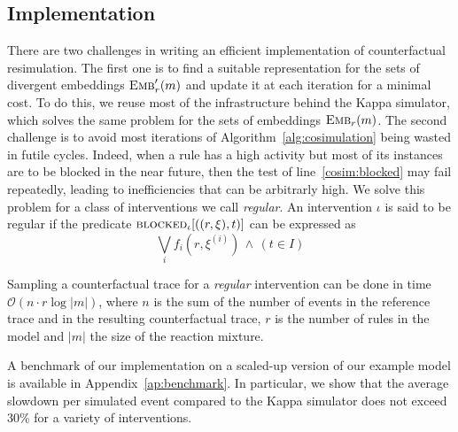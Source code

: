 
\subsection{Implementation}\label{subsec:implementation}

There are two challenges in writing an efficient implementation of
counterfactual resimulation. The first one is to find a suitable
representation for the sets of divergent embeddings ${\textsc{Emb}}'_{r}(m)$ and
update it at each iteration for a minimal cost. To do this, we reuse
most of the infrastructure behind the Kappa simulator, which solves
the same problem for the sets of embeddings ${\textsc{Emb}}_{r}(m)$. The second
challenge is to avoid most iterations of
Algorithm~\ref{alg:cosimulation} being wasted in {futile
  cycles}. Indeed, when a rule has a high activity but most of its
instances are to be blocked in the near future, then the test of
line~\ref{cosim:blocked} may fail repeatedly, leading to inefficiencies
that can be arbitrarly high. We solve this problem for a class of
interventions we call \emph{regular}. An intervention $\iota$ is said
to be regular if the predicate ${\textsc{blocked}}_{\iota}[((r, \xi), t)]$ can be
expressed as
\[ \bigvee_i f_i(r, \xi^{(i)}) \,\wedge\, (t \in I)  \]

\begin{proposition}
  Sampling a counterfactual trace for a \emph{regular} intervention
  can be done in time $\mathcal{O}(n \cdot r \log|m|)$, where $n$ is
  the sum of the number of events in the reference trace and in the
  resulting counterfactual trace, $r$ is the number of rules in the
  model and $|m|$ the size of the reaction mixture.
\end{proposition}

A benchmark of our implementation on a scaled-up version of our
example model is available in Appendix~\ref{ap:benchmark}. In particular,
we show that the average slowdown per simulated event compared to the Kappa
simulator does not exceed 30\% for a variety of interventions.
